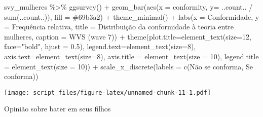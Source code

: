 \documentclass[
]{article}
\newenvironment{Shaded}{\begin{snugshade}}{\end{snugshade}}
\newcommand{\AttributeTok}[1]{\textcolor[rgb]{0.77,0.63,0.00}{#1}}
\newcommand{\DecValTok}[1]{\textcolor[rgb]{0.00,0.00,0.81}{#1}}
\newcommand{\FloatTok}[1]{\textcolor[rgb]{0.00,0.00,0.81}{#1}}
\newcommand{\FunctionTok}[1]{\textcolor[rgb]{0.00,0.00,0.00}{#1}}
\newcommand{\NormalTok}[1]{#1}
\newcommand{\SpecialCharTok}[1]{\textcolor[rgb]{0.00,0.00,0.00}{#1}}
\newcommand{\StringTok}[1]{\textcolor[rgb]{0.31,0.60,0.02}{#1}}
\begin{document}
\begin{Shaded}
\begin{Highlighting}[]
\NormalTok{svy\_mulheres }\SpecialCharTok{\%\textgreater{}\%} 
  \FunctionTok{ggsurvey}\NormalTok{() }\SpecialCharTok{+}
  \FunctionTok{geom\_bar}\NormalTok{(}\FunctionTok{aes}\NormalTok{(}\AttributeTok{x =}\NormalTok{ conformity, }\AttributeTok{y=}\NormalTok{ ..count.. }\SpecialCharTok{/} \FunctionTok{sum}\NormalTok{(..count..)), }\AttributeTok{fill =} \StringTok{\textquotesingle{}\#69b3a2\textquotesingle{}}\NormalTok{) }\SpecialCharTok{+}
  \FunctionTok{theme\_minimal}\NormalTok{() }\SpecialCharTok{+}
  \FunctionTok{labs}\NormalTok{(}\AttributeTok{x =} \StringTok{\textquotesingle{}Conformidade\textquotesingle{}}\NormalTok{,}
       \AttributeTok{y =} \StringTok{\textquotesingle{}Frequência relativa\textquotesingle{}}\NormalTok{,}
       \AttributeTok{title =} \StringTok{\textquotesingle{}Distribuição da conformidade à teoria entre mulheres\textquotesingle{}}\NormalTok{,}
       \AttributeTok{caption =} \StringTok{\textquotesingle{}WVS (wave 7)\textquotesingle{}}\NormalTok{) }\SpecialCharTok{+}
  \FunctionTok{theme}\NormalTok{(}\AttributeTok{plot.title=}\FunctionTok{element\_text}\NormalTok{(}\AttributeTok{size=}\DecValTok{12}\NormalTok{, }\AttributeTok{face=}\StringTok{"bold"}\NormalTok{, }\AttributeTok{hjust =} \FloatTok{0.5}\NormalTok{),}
        \AttributeTok{legend.text=}\FunctionTok{element\_text}\NormalTok{(}\AttributeTok{size=}\DecValTok{8}\NormalTok{),}
        \AttributeTok{axis.text=}\FunctionTok{element\_text}\NormalTok{(}\AttributeTok{size=}\DecValTok{8}\NormalTok{),}
        \AttributeTok{axis.title =} \FunctionTok{element\_text}\NormalTok{(}\AttributeTok{size =} \DecValTok{10}\NormalTok{),}
        \AttributeTok{legend.title =} \FunctionTok{element\_text}\NormalTok{(}\AttributeTok{size =} \DecValTok{10}\NormalTok{)) }\SpecialCharTok{+}
  \FunctionTok{scale\_x\_discrete}\NormalTok{(}\AttributeTok{labels =} \FunctionTok{c}\NormalTok{(}\StringTok{\textquotesingle{}Não se conforma\textquotesingle{}}\NormalTok{, }\StringTok{\textquotesingle{}Se conforma\textquotesingle{}}\NormalTok{))}
\end{Highlighting}
\end{Shaded}

\texttt{[image: script\_files/figure-latex/unnamed-chunk-11-1.pdf]}

Opinião sobre bater em seus filhos
\end{document}
